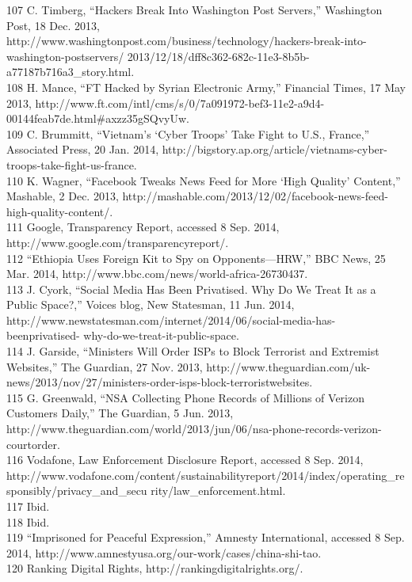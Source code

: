 107 C. Timberg, ``Hackers Break Into Washington Post Servers,'' Washington Post, 18 Dec. 2013,
http://www.washingtonpost.com/business/technology/hackers-break-into-washington-postservers/
2013/12/18/dff8c362-682c-11e3-8b5b-a77187b716a3_story.html.\\
108 H. Mance, ``FT Hacked by Syrian Electronic Army,'' Financial Times, 17 May 2013,
http://www.ft.com/intl/cms/s/0/7a091972-bef3-11e2-a9d4-00144feab7de.html#axzz35gSQvyUw.\\
109 C. Brummitt, ``Vietnam’s ‘Cyber Troops’ Take Fight to U.S., France,'' Associated Press, 20 Jan. 2014,
http://bigstory.ap.org/article/vietnams-cyber-troops-take-fight-us-france.\\
110 K. Wagner, ``Facebook Tweaks News Feed for More ‘High Quality’ Content,'' Mashable, 2 Dec. 2013,
http://mashable.com/2013/12/02/facebook-news-feed-high-quality-content/.\\
111 Google, Transparency Report, accessed 8 Sep. 2014, http://www.google.com/transparencyreport/.\\
112 ``Ethiopia Uses Foreign Kit to Spy on Opponents—HRW,'' BBC News, 25 Mar. 2014,
http://www.bbc.com/news/world-africa-26730437.\\
113 J. Cyork, ``Social Media Has Been Privatised. Why Do We Treat It as a Public Space?,'' Voices blog,
New Statesman, 11 Jun. 2014, http://www.newstatesman.com/internet/2014/06/social-media-has-beenprivatised-
why-do-we-treat-it-public-space.\\
114 J. Garside, ``Ministers Will Order ISPs to Block Terrorist and Extremist Websites,'' The Guardian, 27
Nov. 2013, http://www.theguardian.com/uk-news/2013/nov/27/ministers-order-isps-block-terroristwebsites.\\
115 G. Greenwald, ``NSA Collecting Phone Records of Millions of Verizon Customers Daily,'' The
Guardian, 5 Jun. 2013, http://www.theguardian.com/world/2013/jun/06/nsa-phone-records-verizon-courtorder.\\
116 Vodafone, Law Enforcement Disclosure Report, accessed 8 Sep. 2014,
http://www.vodafone.com/content/sustainabilityreport/2014/index/operating_responsibly/privacy_and_secu
rity/law_enforcement.html.\\
117 Ibid.\\
118 Ibid.\\
119 ``Imprisoned for Peaceful Expression,'' Amnesty International, accessed 8 Sep. 2014,
http://www.amnestyusa.org/our-work/cases/china-shi-tao.\\
120 Ranking Digital Rights, http://rankingdigitalrights.org/.\\
